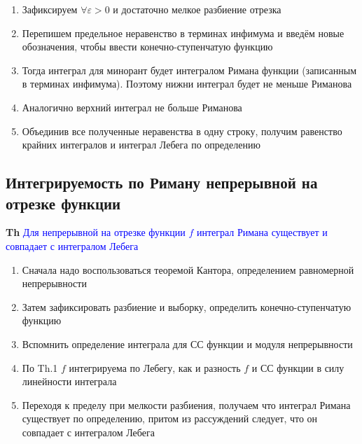 \begin{enumerate}
    \item Зафиксируем $\forall \varepsilon > 0$ и достаточно мелкое разбиение отрезка
    \item Перепишем предельное неравенство в терминах инфимума и введём новые обозначения, чтобы ввести
    конечно-ступенчатую функцию
    \item Тогда интеграл для минорант будет интегралом Римана функции (записанным в терминах инфимума).
    Поэтому нижни интеграл будет не меньше Риманова
    \item Аналогично верхний интеграл не больше Риманова
    \item Объединив все полученные неравенства в одну строку, получим равенство крайних интегралов и интеграл
    Лебега по определению
\end{enumerate}

\subsection{Интегрируемость по Риману непрерывной на отрезке функции}

\textbf{Th} \textcolor{blue}{Для непрерывной на отрезке функции $f$ интеграл Римана существует и совпадает с
интегралом Лебега}

\begin{enumerate}
    \item Сначала надо воспользоваться теоремой Кантора, определением равномерной непрерывности
    \item Затем зафиксировать разбиение и выборку, определить конечно-ступенчатую функцию
    \item Вспомнить определение интеграла для СС функции и модуля непрерывности
    \item По Th.1 $f$ интегрируема по Лебегу, как и разность $f$ и СС функции в силу линейности интеграла
    \item Переходя к пределу при мелкости разбиения, получаем что интеграл Римана существует по определению,
    притом из рассуждений следует, что он совпадает с интегралом Лебега
\end{enumerate}